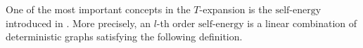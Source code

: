 \documentclass{article}
\newcommand{\1}{\mathds{1}}
\numberwithin{equation}{section}
\newcommand{\be}{\begin{equation}}
\newcommand{\ee}{\end{equation}}
\newcommand{\e}{{\varepsilon}}
\renewcommand{\leq}{\leqslant}
\renewcommand{\le}{\leq}
\newcommand{\Z}{\mathbb{Z}}
\newcommand{\self}{\text{self-energy}}
\newcommand{\selfs}{\text{self-energies}}
\theoremstyle{plain} %
\theoremstyle{remark}
\newcommand{\Sdelta}{{\Sigma}_T}
\newcommand{\Sinfty}{\Sigma^{\infty}}
\newcommand{\Sele}{{\mathcal E}}
\newcommand{\Selek}{{\mathcal E}}
\newcommand{\Seleinf}{{\mathcal E}^{\infty}}
\newcommand{\Cele}{{\mathscr E}}
\begin{document}


One of the most important concepts in the $T$-expansion is the $\self$ introduced in \cite{PartI_high}. More precisely, an $l$-th order $\self$ is a linear combination of deterministic graphs satisfying the following definition.

%
\end{document}
